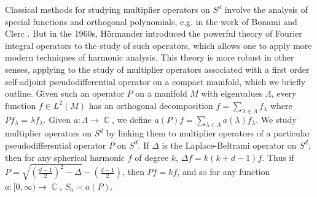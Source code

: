 \documentclass[11pt]{article}
\DeclareMathOperator{\RR}{\mathbb{R}}
\DeclareMathOperator{\CC}{\mathbb{C}}
\begin{document}



Classical methods for studying multiplier operators on $S^d$ involve the analysis of special functions and orthogonal polynomials, e.g. in the work of Bonami and Clerc \cite{BonamiClerc}. But in the 1960s, H\"{o}rmander introduced the powerful theory of Fourier integral operators to the study of such operators, which allows one to apply more modern techniques of harmonic analysis. This theory is more robust in other senses, applying to the study of multiplier operators associated with a first order self-adjoint pseudodifferential operator on a compact manifold, which we briefly outline. Given such an operator $P$ on a manifold $M$ with eigenvalues $\Lambda$, every function $f \in L^2(M)$ has an orthogonal decomposition $f = \sum_{\lambda \in \Lambda} f_\lambda$ where $Pf_\lambda = \lambda f_\lambda$. Given $a: \Lambda \to \CC$, we define $a(P) f = \sum\nolimits_{\lambda \in \Lambda} a(\lambda) f_\lambda$.  We study multiplier operators on $S^d$ by linking them to multiplier operators of a particular pseudodifferential operator $P$ on $S^d$. If $\Delta$ is the Laplace-Beltrami operator on $S^d$, then for any spherical harmonic $f$ of degree $k$, $\Delta f = k(k+d-1) f$. Thus if $P = \sqrt{ ( {\scriptstyle \frac{d-1}{2} } )^2 - \Delta } - \left( {\scriptstyle \frac{d-1}{2}} \right)$, then $Pf = kf$, and so for any function $a: [0,\infty) \to \CC$, $S_a = a(P)$.
\end{document}
